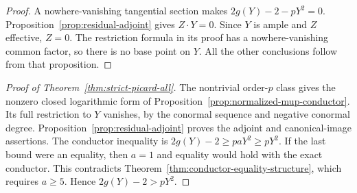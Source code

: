 \begin{proof}
A nowhere-vanishing tangential section makes
$2g(Y)-2-pY^2=0$. Proposition~\ref{prop:residual-adjoint} gives
$Z\cdot Y=0$. Since $Y$ is ample and $Z$ effective, $Z=0$.
The restriction formula in its proof has a nowhere-vanishing common
factor, so there is no base point on $Y$. All the other conclusions
follow from that proposition.
\end{proof}

\begin{proof}[Proof of Theorem~\ref{thm:strict-picard-all}]
The nontrivial order-$p$ class gives the nonzero closed logarithmic
form of Proposition~\ref{prop:normalized-mup-conductor}. Its full
restriction to $Y$ vanishes, by the conormal sequence and negative
conormal degree. Proposition~\ref{prop:residual-adjoint} proves the
adjoint and canonical-image assertions.
The conductor inequality is $2g(Y)-2\geq paY^2\geq pY^2$.
If the last bound were an equality, then $a=1$ and equality would
hold with the exact conductor. This contradicts
Theorem~\ref{thm:conductor-equality-structure}, which requires
$a\geq5$. Hence $2g(Y)-2>pY^2$.
\end{proof}
